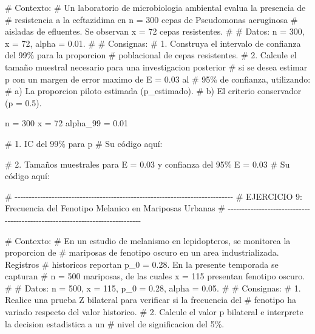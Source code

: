 \documentclass[
  spanish,
  letterpaper,
  DIV=11,
  numbers=noendperiod]{scrreprt}
\newenvironment{Shaded}{\begin{snugshade}}{\end{snugshade}}
\newcommand{\CommentTok}[1]{\textcolor[rgb]{0.37,0.37,0.37}{#1}}
\newcommand{\DecValTok}[1]{\textcolor[rgb]{0.68,0.00,0.00}{#1}}
\newcommand{\FloatTok}[1]{\textcolor[rgb]{0.68,0.00,0.00}{#1}}
\newcommand{\NormalTok}[1]{\textcolor[rgb]{0.00,0.23,0.31}{#1}}
\newcommand{\OtherTok}[1]{\textcolor[rgb]{0.00,0.23,0.31}{#1}}
\begin{document}
\begin{Shaded}
\begin{Highlighting}[]
\CommentTok{\# Contexto:}
\CommentTok{\# Un laboratorio de microbiologia ambiental evalua la presencia de}
\CommentTok{\# resistencia a la ceftazidima en n = 300 cepas de Pseudomonas aeruginosa}
\CommentTok{\# aisladas de efluentes. Se observan x = 72 cepas resistentes.}
\CommentTok{\#}
\CommentTok{\# Datos: n = 300, x = 72, alpha = 0.01.}
\CommentTok{\#}
\CommentTok{\# Consignas:}
\CommentTok{\# 1. Construya el intervalo de confianza del 99\% para la proporcion}
\CommentTok{\#    poblacional de cepas resistentes.}
\CommentTok{\# 2. Calcule el tamaño muestral necesario para una investigacion posterior}
\CommentTok{\#    si se desea estimar p con un margen de error maximo de E = 0.03 al}
\CommentTok{\#    95\% de confianza, utilizando:}
\CommentTok{\#      a) La proporcion piloto estimada (p\_estimado).}
\CommentTok{\#      b) El criterio conservador (p = 0.5).}

\NormalTok{n }\OtherTok{=} \DecValTok{300}
\NormalTok{x }\OtherTok{=} \DecValTok{72}
\NormalTok{alpha\_99 }\OtherTok{=} \FloatTok{0.01}

\CommentTok{\# 1. IC del 99\% para p}
\CommentTok{\# Su código aquí:}



\CommentTok{\# 2. Tamaños muestrales para E = 0.03 y confianza del 95\%}
\NormalTok{E }\OtherTok{=} \FloatTok{0.03}
\CommentTok{\# Su código aquí:}



\CommentTok{\# {-}{-}{-}{-}{-}{-}{-}{-}{-}{-}{-}{-}{-}{-}{-}{-}{-}{-}{-}{-}{-}{-}{-}{-}{-}{-}{-}{-}{-}{-}{-}{-}{-}{-}{-}{-}{-}{-}{-}{-}{-}{-}{-}{-}{-}{-}{-}{-}{-}{-}{-}{-}{-}{-}{-}{-}{-}{-}{-}{-}{-}{-}{-}{-}{-}{-}{-}{-}{-}{-}{-}{-}{-}{-}{-}{-}{-}}
\CommentTok{\# EJERCICIO 9: Frecuencia del Fenotipo Melanico en Mariposas Urbanas}
\CommentTok{\# {-}{-}{-}{-}{-}{-}{-}{-}{-}{-}{-}{-}{-}{-}{-}{-}{-}{-}{-}{-}{-}{-}{-}{-}{-}{-}{-}{-}{-}{-}{-}{-}{-}{-}{-}{-}{-}{-}{-}{-}{-}{-}{-}{-}{-}{-}{-}{-}{-}{-}{-}{-}{-}{-}{-}{-}{-}{-}{-}{-}{-}{-}{-}{-}{-}{-}{-}{-}{-}{-}{-}{-}{-}{-}{-}{-}{-}}

\CommentTok{\# Contexto:}
\CommentTok{\# En un estudio de melanismo en lepidopteros, se monitorea la proporcion de}
\CommentTok{\# mariposas de fenotipo oscuro en un area industrializada. Registros}
\CommentTok{\# historicos reportan p\_0 = 0.28. En la presente temporada se capturan}
\CommentTok{\# n = 500 mariposas, de las cuales x = 115 presentan fenotipo oscuro.}
\CommentTok{\#}
\CommentTok{\# Datos: n = 500, x = 115, p\_0 = 0.28, alpha = 0.05.}
\CommentTok{\#}
\CommentTok{\# Consignas:}
\CommentTok{\# 1. Realice una prueba Z bilateral para verificar si la frecuencia del}
\CommentTok{\#    fenotipo ha variado respecto del valor historico.}
\CommentTok{\# 2. Calcule el valor p bilateral e interprete la decision estadistica a un}
\CommentTok{\#    nivel de significacion del 5\%.}


\end{Highlighting}
\end{Shaded}
\end{document}
